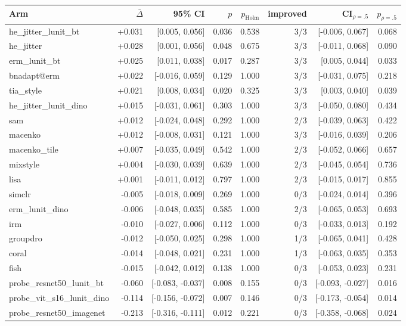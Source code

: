 \begin{tabular}{lrrrrrrr}
\toprule
Arm & $\bar\Delta$ & 95\% CI & $p$ & $p_\text{Holm}$ & improved & CI$_{\rho=.5}$ & $p_{\rho=.5}$ \\
\midrule
he\_jitter\_lunit\_bt & +0.031 & [0.005, 0.056] & 0.036 & 0.538 & 3/3 & [-0.006, 0.067] & 0.068 \\
he\_jitter & +0.028 & [0.001, 0.056] & 0.048 & 0.675 & 3/3 & [-0.011, 0.068] & 0.090 \\
erm\_lunit\_bt & +0.025 & [0.011, 0.038] & 0.017 & 0.287 & 3/3 & [0.005, 0.044] & 0.033 \\
bnadapt@erm & +0.022 & [-0.016, 0.059] & 0.129 & 1.000 & 3/3 & [-0.031, 0.075] & 0.218 \\
tia\_style & +0.021 & [0.008, 0.034] & 0.020 & 0.325 & 3/3 & [0.003, 0.040] & 0.039 \\
he\_jitter\_lunit\_dino & +0.015 & [-0.031, 0.061] & 0.303 & 1.000 & 3/3 & [-0.050, 0.080] & 0.434 \\
sam & +0.012 & [-0.024, 0.048] & 0.292 & 1.000 & 2/3 & [-0.039, 0.063] & 0.422 \\
macenko & +0.012 & [-0.008, 0.031] & 0.121 & 1.000 & 3/3 & [-0.016, 0.039] & 0.206 \\
macenko\_tile & +0.007 & [-0.035, 0.049] & 0.542 & 1.000 & 2/3 & [-0.052, 0.066] & 0.657 \\
mixstyle & +0.004 & [-0.030, 0.039] & 0.639 & 1.000 & 2/3 & [-0.045, 0.054] & 0.736 \\
lisa & +0.001 & [-0.011, 0.012] & 0.797 & 1.000 & 2/3 & [-0.015, 0.017] & 0.855 \\
simclr & -0.005 & [-0.018, 0.009] & 0.269 & 1.000 & 0/3 & [-0.024, 0.014] & 0.396 \\
erm\_lunit\_dino & -0.006 & [-0.048, 0.035] & 0.585 & 1.000 & 2/3 & [-0.065, 0.053] & 0.693 \\
irm & -0.010 & [-0.027, 0.006] & 0.112 & 1.000 & 0/3 & [-0.033, 0.013] & 0.192 \\
groupdro & -0.012 & [-0.050, 0.025] & 0.298 & 1.000 & 1/3 & [-0.065, 0.041] & 0.428 \\
coral & -0.014 & [-0.048, 0.021] & 0.231 & 1.000 & 1/3 & [-0.063, 0.035] & 0.353 \\
fish & -0.015 & [-0.042, 0.012] & 0.138 & 1.000 & 0/3 & [-0.053, 0.023] & 0.231 \\
probe\_resnet50\_lunit\_bt & -0.060 & [-0.083, -0.037] & 0.008 & 0.155 & 0/3 & [-0.093, -0.027] & 0.016 \\
probe\_vit\_s16\_lunit\_dino & -0.114 & [-0.156, -0.072] & 0.007 & 0.146 & 0/3 & [-0.173, -0.054] & 0.014 \\
probe\_resnet50\_imagenet & -0.213 & [-0.316, -0.111] & 0.012 & 0.221 & 0/3 & [-0.358, -0.068] & 0.024 \\
\bottomrule
\end{tabular}
